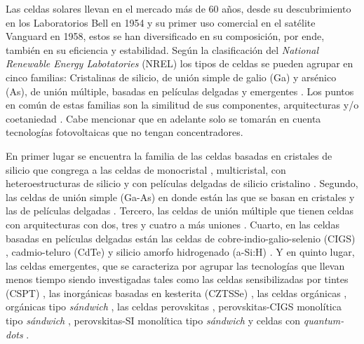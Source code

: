 Las celdas solares llevan en el mercado más de 60 años, desde su descubrimiento en los  Laboratorios Bell en 1954 \cite{green2009path} y su primer uso comercial en el satélite Vanguard \cite{singh2013solar} en 1958, estos se han diversificado en su composición, por ende, también en su eficiencia y estabilidad. Según la clasificación del \textit{National Renewable Energy Labotatories} (NREL) los tipos de celdas se pueden agrupar en cinco familias: Cristalinas de silicio, de unión simple de galio (Ga) y arsénico (As), de unión múltiple, basadas en películas delgadas y emergentes \cite{nrel}. Los puntos en común de estas familias son la similitud de sus componentes, arquitecturas y/o coetaniedad \cite{blakers2013}. Cabe mencionar que en adelante solo se tomarán en cuenta tecnologías fotovoltaicas que no tengan concentradores.


En primer lugar se encuentra la familia de las celdas basadas en cristales de silicio que congrega a las celdas de monocristal \cite{gul2016}, multicristal\cite{moller2005multicrystalline}, con heteroestructuras de silicio \cite{sark2012introduction} y con películas delgadas de silicio cristalino \cite{brendel2011thin}. Segundo, las celdas de unión simple (Ga-As) en donde están las que se basan en cristales y las de películas delgadas \cite{konagai1978high}. Tercero, las celdas de unión múltiple que tienen celdas con arquitecturas con dos, tres y cuatro a más uniones \cite{dimroth2007high, philipps2018high}. Cuarto, en las celdas basadas en películas delgadas están las celdas de cobre-indio-galio-selenio (CIGS) \cite{wada2001high}, cadmio-teluro (CdTe) \cite{ferekides2004cdte} y silicio amorfo hidrogenado (a-Si:H) \cite{krvc2003analysis}. Y en quinto lugar, las celdas emergentes, que se caracteriza por agrupar las tecnologías que llevan menos tiempo siendo investigadas tales como las celdas sensibilizadas por tintes (CSPT) \cite{sharma2018dye}, las inorgánicas basadas en kesterita  (CZTSSe) \cite{suryawanshi2013czts}, las celdas orgánicas \cite{hoppe2004organic}, orgánicas tipo \textit{sándwich} \cite{ameri2009organic}, las celdas perovskitas \cite{jung2015perovskite}, perovskitas-CIGS monolítica tipo \textit{sándwich} \cite{li2020perovskite}, perovskitas-SI monolítica tipo \textit{sándwich} \cite{li2020perovskite} y celdas con \textit{quantum-dots} \cite{kim2022conformal}. 

